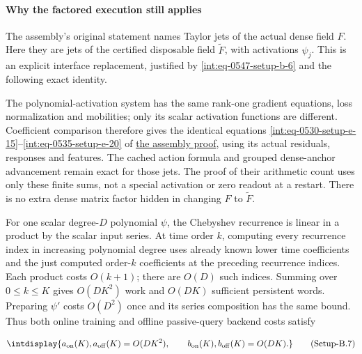 \paragraph{Why the factored execution still applies}
\label{int:setup-bridge-2}
\mbox{}\par\smallskip


The assembly's original statement names Taylor jets of the actual dense field \(F\). Here they are jets of the certified disposable field \(\widetilde F\), with activations \(\psi_j\). This is an explicit interface replacement, justified by \hyperref[int:eq-setup-b-6]{\eqref{int:eq-0547-setup-b-6}} and the following exact identity.



The polynomial-activation system has the same rank-one gradient equations, loss normalization and mobilities; only its scalar activation functions are different. Coefficient comparison therefore gives the identical equations \hyperref[int:eq-setup-e-15]{\eqref{int:eq-0530-setup-e-15}}--\allowbreak \hyperref[int:eq-setup-e-20]{\eqref{int:eq-0535-setup-e-20}} of \hyperref[int:setup-assembly]{the assembly proof}, using its actual residuals, responses and features. The cached action formula and grouped dense-anchor advancement remain exact for those jets. The proof of their arithmetic count uses only these finite sums, not a special activation or zero readout at a restart. There is no extra dense matrix factor hidden in changing \(F\) to \(\widetilde F\).



For one scalar degree-\(D\) polynomial \(\psi\), the Chebyshev recurrence is linear in a product by the scalar input series. At time order \(k\), computing every recurrence index in increasing polynomial degree uses already known lower time coefficients and the just computed order-\(k\) coefficients at the preceding recurrence indices. Each product costs \(O(k+1)\); there are \(O(D)\) such indices. Summing over \(0\le k\le K\) gives \(O(DK^2)\) work and \(O(DK)\) sufficient persistent words. Preparing \(\psi'\) costs \(O(D^2)\) once and its series composition has the same bound. Thus both online training and offline passive-query backend costs satisfy


\label{int:eq-setup-b-7}
\begingroup\renewcommand{\theHequation}{intdisplay.1039}
\begin{equation}
\intdisplay{
a_{\rm on}(K),a_{\rm off}(K)=O(DK^2),\qquad
b_{\rm on}(K),b_{\rm off}(K)=O(DK).
}
\tag{Setup-B.7}
\label{int:eq-0548-setup-b-7}
\end{equation}
\endgroup

